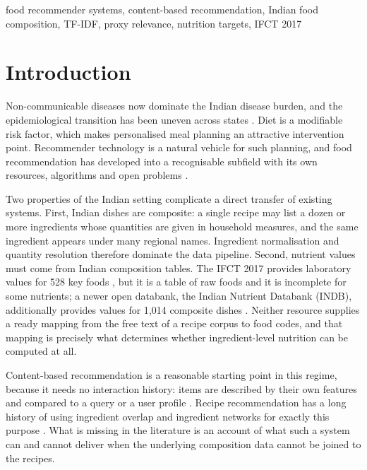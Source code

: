 \documentclass[conference]{IEEEtran}
\begin{document}
\begin{IEEEkeywords}
food recommender systems, content-based recommendation, Indian food composition,
TF-IDF, proxy relevance, nutrition targets, IFCT 2017
\end{IEEEkeywords}

\section{Introduction}
\label{sec:intro}

Non-communicable diseases now dominate the Indian disease burden, and the
epidemiological transition has been uneven across states \cite{isdb2017}. Diet is
a modifiable risk factor, which makes personalised meal planning an attractive
intervention point. Recommender technology is a natural vehicle for such planning,
and food recommendation has developed into a recognisable subfield with its own
resources, algorithms and open problems \cite{trattner2017}.

Two properties of the Indian setting complicate a direct transfer of existing
systems. First, Indian dishes are composite: a single recipe may list a dozen or
more ingredients whose quantities are given in household measures, and the same
ingredient appears under many regional names. Ingredient normalisation and
quantity resolution therefore dominate the data pipeline. Second, nutrient values
must come from Indian composition tables. The IFCT 2017 provides laboratory values
for 528 key foods \cite{ifct2017}, but it is a table of raw foods and it is
incomplete for some nutrients; a newer open databank, the Indian Nutrient Databank
(INDB), additionally provides values for 1{,}014 composite dishes \cite{indb2024}.
Neither resource supplies a ready mapping from the free text of a recipe corpus to
food codes, and that mapping is precisely what determines whether
ingredient-level nutrition can be computed at all.

Content-based recommendation is a reasonable starting point in this regime,
because it needs no interaction history: items are described by their own features
and compared to a query or a user profile \cite{pazzani2007}. Recipe
recommendation has a long history of using ingredient overlap and ingredient
networks for exactly this purpose \cite{teng2012,freyne2010}. What is missing in
the literature is an account of what such a system can and cannot deliver when the
underlying composition data cannot be joined to the recipes.
\end{document}

